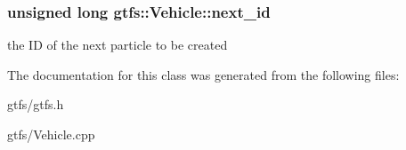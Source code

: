 \subsubsection[{\texorpdfstring{next\+\_\+id}{next_id}}]{\setlength{\rightskip}{0pt plus 5cm}unsigned long gtfs\+::\+Vehicle\+::next\+\_\+id}\hypertarget{classgtfs_1_1Vehicle_aab535dd9953f9650e2adc351965779b1}{}\label{classgtfs_1_1Vehicle_aab535dd9953f9650e2adc351965779b1}
the ID of the next particle to be created 

The documentation for this class was generated from the following files\+:\begin{DoxyCompactItemize}
\item 
gtfs/gtfs.\+h\item 
gtfs/Vehicle.\+cpp\end{DoxyCompactItemize}
